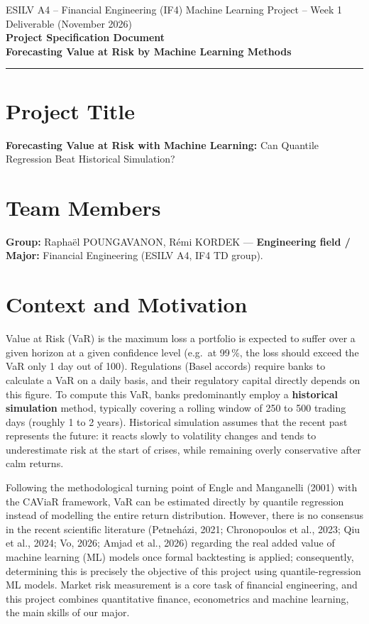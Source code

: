 \documentclass[10pt,a4paper]{article}
\begin{document}
{\sffamily\footnotesize\color{gray!70!black} ESILV A4 -- Financial Engineering (IF4) \hfill Machine Learning Project -- Week 1 Deliverable (November 2026)}\\[2pt]
{\LARGE\bfseries Project Specification Document}\\[2pt]
{\sffamily\bfseries Forecasting Value at Risk by Machine Learning Methods}\\[-4pt]
\rule{\linewidth}{1.2pt}

\section{Project Title}
\textbf{Forecasting Value at Risk with Machine Learning:} Can Quantile Regression Beat Historical Simulation?

\section{Team Members}
\textbf{Group:} Raphaël POUNGAVANON, Rémi KORDEK --- \textbf{Engineering field / Major:} Financial Engineering (ESILV A4, IF4 TD group).

\section{Context and Motivation}
Value at Risk (VaR) is the maximum loss a portfolio is expected to suffer over a given horizon at a given confidence level (e.g.\ at 99\,\%, the loss should exceed the VaR only 1 day out of 100). Regulations (Basel accords) require banks to calculate a VaR on a daily basis, and their regulatory capital directly depends on this figure. To compute this VaR, banks predominantly employ a \textbf{historical simulation} method, typically covering a rolling window of 250 to 500 trading days (roughly 1 to 2 years). Historical simulation assumes that the recent past represents the future: it reacts slowly to volatility changes and tends to underestimate risk at the start of crises, while remaining overly conservative after calm returns.

Following the methodological turning point of Engle and Manganelli (2001) with the CAViaR framework, VaR can be estimated directly by quantile regression instead of modelling the entire return distribution. However, there is no consensus in the recent scientific literature (Petneházi, 2021; Chronopoulos et al., 2023; Qiu et al., 2024; Vo, 2026; Amjad et al., 2026) regarding the real added value of machine learning (ML) models once formal backtesting is applied; consequently, determining this is precisely the objective of this project using quantile-regression ML models. Market risk measurement is a core task of financial engineering, and this project combines quantitative finance, econometrics and machine learning, the main skills of our major.
\end{document}
